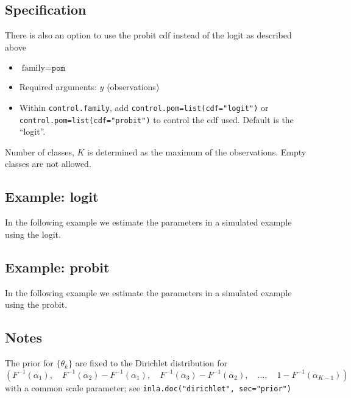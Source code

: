 \documentclass[a4paper,11pt]{article}
\begin{document}
\subsection*{Specification}

There is also an option to use the probit cdf instead of the logit as
described above
\begin{itemize}
\item $\text{family}=\texttt{pom}$
\item Required arguments: $y$ (observations)
\item Within \texttt{control.family}, add
    \texttt{control.pom=list(cdf="logit")} or \\
    \texttt{control.pom=list(cdf="probit")} to control the cdf used.
    Default is the ``logit''.
\end{itemize}
Number of classes, $K$ is determined as the maximum of the
observations. Empty classes are not allowed.




\subsection*{Example: logit}

In the following example we estimate the parameters in a simulated
example using the logit.
{\small

}

\subsection*{Example: probit}

In the following example we estimate the parameters in a simulated
example using the probit.
{\small

}

\subsection*{Notes}

The prior for $\{\theta_k\}$ are fixed to the Dirichlet distribution
for
\begin{displaymath}
    \left(F^{-1}(\alpha_1),\quad
    F^{-1}(\alpha_2)- F^{-1}(\alpha_1),\quad
    F^{-1}(\alpha_3)- F^{-1}(\alpha_2),\quad
    \ldots,\quad
    1-F^{-1}(\alpha_{K-1})\right)
\end{displaymath}    
with a common scale parameter; see \texttt{inla.doc("dirichlet", sec="prior")}
\end{document}
